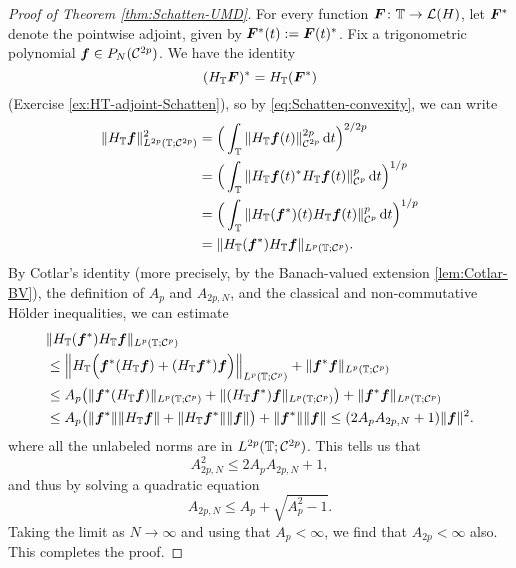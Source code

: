 \begin{proof}[Proof of Theorem \ref{thm:Schatten-UMD}]
  For every function $\bm{F} \colon \mathbb{T} \to \mathcal{L}(H)$, let $\bm{F}^*$ denote the pointwise adjoint, given by $\bm{F}^{*}(t) := \bm{F}(t)^*$.
  Fix a trigonometric polynomial $\bm{f} \in P_{N}(\mathcal{C}^{2p})$.
  We have the identity
  \begin{equation*}
    (H_{\mathbb{T}} \bm{F})^{*} = H_{\mathbb{T}} (\bm{F}^*)
  \end{equation*}
  (Exercise \ref{ex:HT-adjoint-Schatten}), so by \eqref{eq:Schatten-convexity}, we can write
  \begin{equation*}
    \begin{aligned}
      \|H_{\mathbb{T}} \bm{f}\|_{L^{2p}(\mathbb{T};\mathcal{C}^{2p})}^{2}
      &= \Big( \int_{\mathbb{T}} \|H_{\mathbb{T}} \bm{f}(t) \|_{\mathcal{C}^{2p}}^{2p} \, \mathrm{d} t \Big)^{2/2p} \\
      &= \Big( \int_{\mathbb{T}} \|H_{\mathbb{T}} \bm{f}(t)^* H_{\mathbb{T}} \bm{f}(t) \|_{\mathcal{C}^{p}}^{p} \, \mathrm{d} t \Big)^{1/p} \\
      &= \Big( \int_{\mathbb{T}} \|H_{\mathbb{T}} (\bm{f}^{*})(t) H_{\mathbb{T}} \bm{f}(t) \|_{\mathcal{C}^{p}}^{p} \, \mathrm{d} t \Big)^{1/p} \\
      &= \|H_{\mathbb{T}} (\bm{f}^*) H_{\mathbb{T}} \bm{f}\|_{L^p(\mathbb{T};\mathcal{C}^{p})}.
    \end{aligned}
  \end{equation*}
  By Cotlar's identity (more precisely, by the Banach-valued extension \eqref{lem:Cotlar-BV}), the definition of $A_{p}$ and $A_{2p,N}$, and the classical and non-commutative H\"older inequalities, we can estimate
  \begin{equation*}
    \begin{aligned}
      &\|H_{\mathbb{T}} (\bm{f}^*) H_{\mathbb{T}} \bm{f}\|_{L^p(\mathbb{T};\mathcal{C}^{p})} \\
      &\leq \Big\|H_{\mathbb{T}}\Big(\bm{f}^* (H_{\mathbb{T}} \bm{f}) + (H_{\mathbb{T}} \bm{f}^*)\bm{f} \Big) \Big\|_{L^p(\mathbb{T};\mathcal{C}^{p})} + \|\bm{f}^{*} \bm{f}\|_{L^p(\mathbb{T};\mathcal{C}^{p})} \\
      &\leq A_{p} \big( \|\bm{f}^* (H_{\mathbb{T}} \bm{f})\|_{L^p(\mathbb{T};\mathcal{C}^{p})} + \| (H_{\mathbb{T}} \bm{f}^*)\bm{f} \|_{L^p(\mathbb{T};\mathcal{C}^{p})} \big) + \|\bm{f}^{*} \bm{f}\|_{L^p(\mathbb{T};\mathcal{C}^{p})} \\
      &\leq A_{p} \big( \|\bm{f}^*\| \|H_{\mathbb{T}} \bm{f}\| + \| H_{\mathbb{T}} \bm{f}^*\| \| \bm{f} \| \big)   + \|\bm{f}^{*}\| \| \bm{f}\| 
      \leq (2A_{p} A_{2p,N} + 1) \|\bm{f}\|^{2}.
    \end{aligned}
  \end{equation*}
  where all the unlabeled norms are in $L^{2p}(\mathbb{T};\mathcal{C}^{2p})$.
  This tells us that
  \begin{equation*}
    A_{2p,N}^{2} \leq 2A_{p} A_{2p,N} + 1,
  \end{equation*}
  and thus by solving a quadratic equation
  \begin{equation*}
    A_{2p,N} \leq A_{p} + \sqrt{A_{p}^{2} - 1}.
  \end{equation*}
  Taking the limit as $N \to \infty$ and using that $A_{p} < \infty$, we find that $A_{2p} < \infty$ also.
  This completes the proof.
\end{proof}

